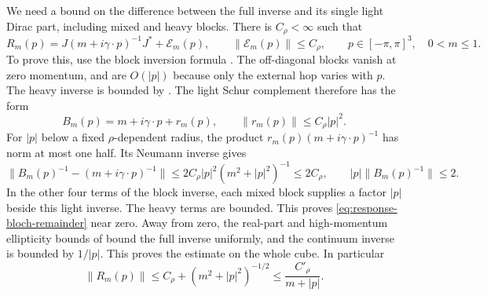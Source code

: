 We need a bound on the difference between the full inverse
and its single light Dirac part, including mixed and heavy
blocks. There is $C_\rho<\infty$ such that
\begin{equation}\label{eq:response-bloch-remainder}
 R_m(p)=J(m+i\gamma\cdot p)^{-1}J^*+\mathcal E_m(p),\qquad
 \|\mathcal E_m(p)\|\le C_\rho,\qquad p\in[-\pi,\pi]^3,\quad0<m\le1.
\end{equation}
To prove this, use the block inversion formula
\cite[(16)]{FermionBlock}. The off-diagonal blocks
vanish at zero momentum, and are $O(|p|)$ because only
the external hop varies with $p$. The heavy inverse is
bounded by \cite[(10)]{FermionBlock}. The light Schur complement
therefore has the form
\[
 B_m(p)=m+i\gamma\cdot p+r_m(p),\qquad
                    \|r_m(p)\|\le C_\rho|p|^2.
\]
For $|p|$ below a fixed $\rho$-dependent radius, the product
$r_m(p)(m+i\gamma\cdot p)^{-1}$ has norm at most one half.
Its Neumann inverse gives
\[
 \|B_m(p)^{-1}-(m+i\gamma\cdot p)^{-1}\|
        \le2C_\rho |p|^2(m^2+|p|^2)^{-1}\le2C_\rho,
 \qquad |p|\|B_m(p)^{-1}\|\le2.
\]
In the other four terms of the block inverse, each mixed
block supplies a factor $|p|$ beside this light inverse.
The heavy terms are bounded. This proves
\eqref{eq:response-bloch-remainder} near zero. Away from
zero, the real-part and high-momentum ellipticity bounds
of \cite[\S2.2]{FermionBlock} bound the full inverse uniformly,
and the continuum inverse is bounded by $1/|p|$. This
proves the estimate on the whole cube. In particular
\begin{equation}\label{eq:response-bloch-bounds}
 \|R_m(p)\|\le C_\rho+(m^2+|p|^2)^{-1/2}
                    \le\frac{C'_\rho}{m+|p|}.
\end{equation}

